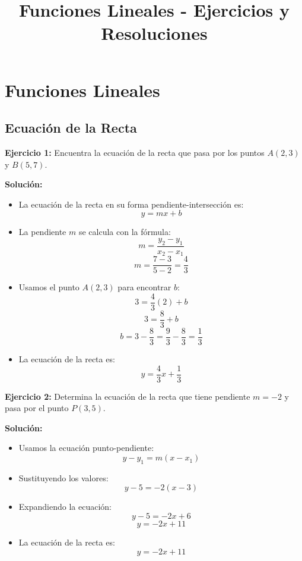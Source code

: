 \documentclass{profesor}
\title{Funciones Lineales - Ejercicios y Resoluciones}
\begin{document}
\maketitle
\tableofcontents
\newpage

\section{Funciones Lineales}

\subsection{Ecuación de la Recta}

\textbf{Ejercicio 1:}  
Encuentra la ecuación de la recta que pasa por los puntos \( A(2,3) \) y \( B(5,7) \).

\textbf{Solución:}  
\begin{itemize}
    \item La ecuación de la recta en su forma pendiente-intersección es:
    \[
    y = mx + b
    \]
    \item La pendiente \( m \) se calcula con la fórmula:
    \[
    m = \frac{y_2 - y_1}{x_2 - x_1}
    \]
    \[
    m = \frac{7 - 3}{5 - 2} = \frac{4}{3}
    \]
    \item Usamos el punto \( A(2,3) \) para encontrar \( b \):
    \[
    3 = \frac{4}{3}(2) + b
    \]
    \[
    3 = \frac{8}{3} + b
    \]
    \[
    b = 3 - \frac{8}{3} = \frac{9}{3} - \frac{8}{3} = \frac{1}{3}
    \]
    \item La ecuación de la recta es:
    \[
    y = \frac{4}{3}x + \frac{1}{3}
    \]
\end{itemize}

\textbf{Ejercicio 2:}  
Determina la ecuación de la recta que tiene pendiente \( m = -2 \) y pasa por el punto \( P(3,5) \).

\textbf{Solución:}  
\begin{itemize}
    \item Usamos la ecuación punto-pendiente:
    \[
    y - y_1 = m(x - x_1)
    \]
    \item Sustituyendo los valores:
    \[
    y - 5 = -2(x - 3)
    \]
    \item Expandiendo la ecuación:
    \[
    y - 5 = -2x + 6
    \]
    \[
    y = -2x + 11
    \]
    \item La ecuación de la recta es:
    \[
    y = -2x + 11
    \]
\end{itemize}
\end{document}
